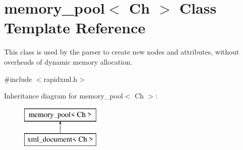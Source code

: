 \hypertarget{classrapidxml_1_1memory__pool}{}\section{memory\+\_\+pool$<$ Ch $>$ Class Template Reference}
\label{classrapidxml_1_1memory__pool}


This class is used by the parser to create new nodes and attributes, without overheads of dynamic memory allocation.  




{\ttfamily \#include $<$rapidxml.\+h$>$}

Inheritance diagram for memory\+\_\+pool$<$ Ch $>$\+:\begin{figure}[H]
\begin{center}
\leavevmode
\includegraphics[height=2.000000cm]{classrapidxml_1_1memory__pool}
\end{center}
\end{figure}
